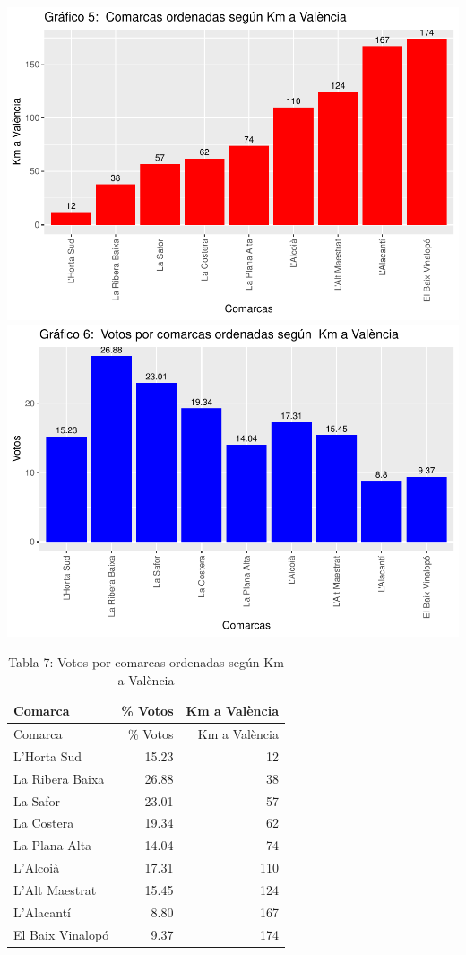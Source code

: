 \documentclass[
]{article}
\begin{document}
\includegraphics{votovalencianista-ea2023_files/figure-latex/ordenDistanciacapital-1.pdf}
\includegraphics{votovalencianista-ea2023_files/figure-latex/ordenDistanciacapital-2.pdf}

\begin{longtable}[]{@{}lrr@{}}
\caption{Tabla 7: Votos por comarcas ordenadas según Km a
València}\tabularnewline
\toprule\noalign{}
Comarca & \% Votos & Km a València \\
\midrule\noalign{}
\endfirsthead
\toprule\noalign{}
Comarca & \% Votos & Km a València \\
\midrule\noalign{}
\endhead
\bottomrule\noalign{}
\endlastfoot
L'Horta Sud & 15.23 & 12 \\
La Ribera Baixa & 26.88 & 38 \\
La Safor & 23.01 & 57 \\
La Costera & 19.34 & 62 \\
La Plana Alta & 14.04 & 74 \\
L'Alcoià & 17.31 & 110 \\
L'Alt Maestrat & 15.45 & 124 \\
L'Alacantí & 8.80 & 167 \\
El Baix Vinalopó & 9.37 & 174 \\
\end{longtable}
\end{document}
